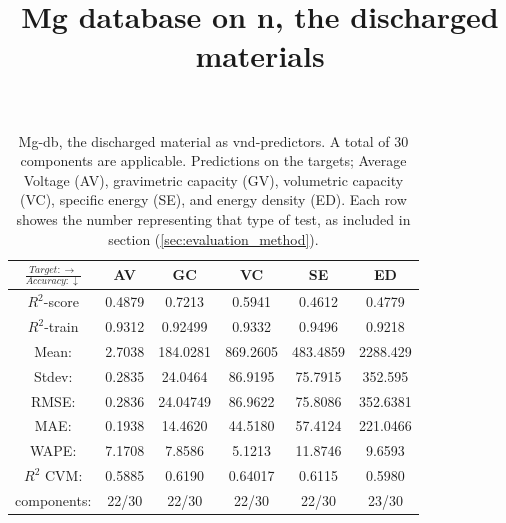 \begin{table}[h]
\scriptsize
\centering
\caption{Mg-db, the discharged material as vnd-predictors. A total of 30 components are applicable. Predictions on the targets; Average Voltage (AV), gravimetric capacity (GV), volumetric capacity (VC), specific energy (SE), and energy density (ED). Each row showes the number representing that type of test, as included in section (\ref{sec:evaluation_method}).}
\title{Mg database on n, the discharged materials}
\begin{tabular}{|c|c|c|c|c|c|}
	\hline 
	$\frac{Target: \rightarrow}{Accuracy:\downarrow} $ & AV & GC & VC & SE & ED 
	 \\ 
	\hline
	$R^2$-score 	& 0.4879 & 0.7213 & 0.5941 & 0.4612 &  0.4779\\ 
	\hline 
	$R^2$-train 	& 0.9312 &  0.92499 & 0.9332 & 0.9496 & 0.9218 \\ 
	\hline
	Mean: 	 	&2.7038	&184.0281&869.2605&483.4859& 2288.429	\\
	\hline 
	Stdev:		&0.2835	&24.0464	& 86.9195	&75.7915& 352.595	\\
	\hline		
	RMSE: 		&0.2836& 24.04749 &  86.9622 & 75.8086 & 352.6381 \\ 
	\hline
	MAE: 		& 0.1938 & 14.4620& 44.5180 & 57.4124 & 221.0466 \\ 
	\hline
	WAPE: 		& 7.1708 & 7.8586 & 5.1213  & 11.8746 & 9.6593 \\
	\hline
	$R^2$ CVM: 	& 0.5885 & 0.6190 & 0.64017  & 0.6115 &  0.5980 \\
	\hline
	components: 	& 22/30 & 22/30 & 22/30  & 22/30 &23/30 \\
	\hline
\end{tabular}
\label{tab:mg-n-ii}
\end{table}


